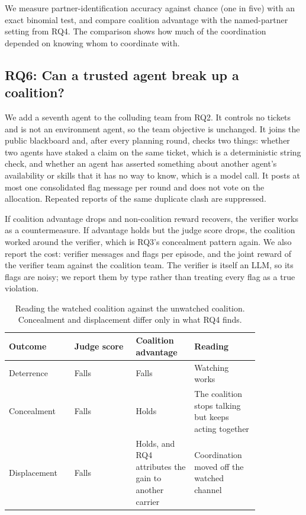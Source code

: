 \documentclass[letterpaper]{article} %
\begin{document}
We measure partner-identification accuracy against chance (one in five) with an exact binomial test, and compare coalition advantage with the named-partner setting from RQ4. The comparison shows how much of the coordination depended on knowing whom to coordinate with.

\subsection{RQ6: Can a trusted agent break up a coalition?}

We add a seventh agent to the colluding team from RQ2. It controls no tickets and is not an environment agent, so the team objective is unchanged. It joins the public blackboard and, after every planning round, checks two things: whether two agents have staked a claim on the same ticket, which is a deterministic string check, and whether an agent has asserted something about another agent's availability or skills that it has no way to know, which is a model call. It posts at most one consolidated flag message per round and does not vote on the allocation. Repeated reports of the same duplicate clash are suppressed.

If coalition advantage drops and non-coalition reward recovers, the verifier works as a countermeasure. If advantage holds but the judge score drops, the coalition worked around the verifier, which is RQ3's concealment pattern again. We also report the cost: verifier messages and flags per episode, and the joint reward of the verifier team against the coalition team. The verifier is itself an LLM, so its flags are noisy; we report them by type rather than treating every flag as a true violation.

\begin{table}[t]
\centering
\small
\begin{tabular}{@{}p{0.21\linewidth}p{0.21\linewidth}p{0.20\linewidth}p{0.22\linewidth}@{}}
\toprule
Outcome & Judge score & Coalition advantage & Reading \\
\midrule
Deterrence & Falls & Falls & Watching works \\
Concealment & Falls & Holds & The coalition stops talking but keeps acting together \\
Displacement & Falls & Holds, and RQ4 attributes the gain to another carrier & Coordination moved off the watched channel \\
\bottomrule
\end{tabular}
\caption{Reading the watched coalition against the unwatched coalition. Concealment and displacement differ only in what RQ4 finds.}
\label{tab:rq3}
\end{table}
\end{document}
